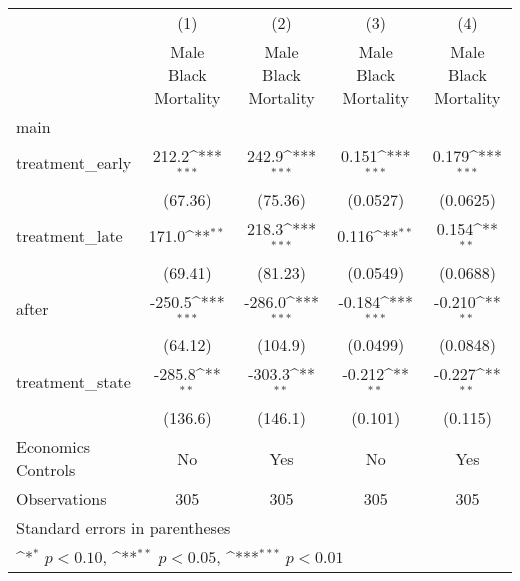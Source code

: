 {
\def\sym#1{\ifmmode^{#1}\else\(^{#1}\)\fi}
\begin{longtable}{l*{4}{c}}
\hline\hline\endfirsthead\hline\endhead\hline\endfoot\endlastfoot
                    &\multicolumn{1}{c}{(1)}&\multicolumn{1}{c}{(2)}&\multicolumn{1}{c}{(3)}&\multicolumn{1}{c}{(4)}\\
                    &\multicolumn{1}{c}{Male Black Mortality}&\multicolumn{1}{c}{Male Black Mortality}&\multicolumn{1}{c}{Male Black Mortality}&\multicolumn{1}{c}{Male Black Mortality}\\
\hline
main                &                     &                     &                     &                     \\
treatment\_early     &       212.2\sym{***}&       242.9\sym{***}&       0.151\sym{***}&       0.179\sym{***}\\
                    &     (67.36)         &     (75.36)         &    (0.0527)         &    (0.0625)         \\
[1em]
treatment\_late      &       171.0\sym{**} &       218.3\sym{***}&       0.116\sym{**} &       0.154\sym{**} \\
                    &     (69.41)         &     (81.23)         &    (0.0549)         &    (0.0688)         \\
[1em]
after               &      -250.5\sym{***}&      -286.0\sym{***}&      -0.184\sym{***}&      -0.210\sym{**} \\
                    &     (64.12)         &     (104.9)         &    (0.0499)         &    (0.0848)         \\
[1em]
treatment\_state     &      -285.8\sym{**} &      -303.3\sym{**} &      -0.212\sym{**} &      -0.227\sym{**} \\
                    &     (136.6)         &     (146.1)         &     (0.101)         &     (0.115)         \\
[1em]
Economics Controls  &          No         &         Yes         &          No         &         Yes         \\
\hline
Observations        &         305         &         305         &         305         &         305         \\
\hline\hline
\multicolumn{5}{l}{\footnotesize Standard errors in parentheses}\\
\multicolumn{5}{l}{\footnotesize \sym{*} \(p<0.10\), \sym{**} \(p<0.05\), \sym{***} \(p<0.01\)}\\
\end{longtable}
}
